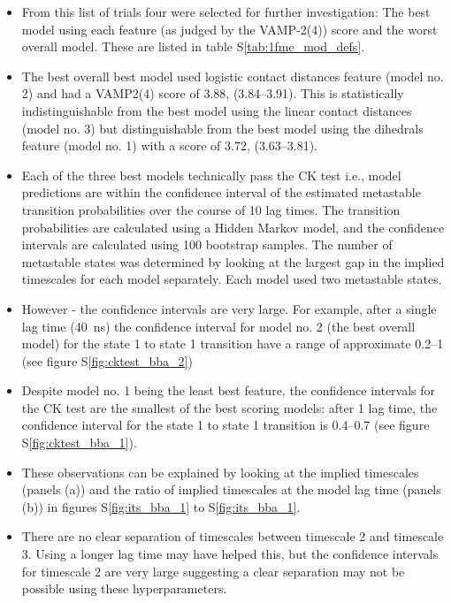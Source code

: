 \documentclass[journal=jacsat,manuscript=article]{achemso}
\newcommand*\sref[1]{%
    S\ref{#1}}
\begin{document}
\begin{itemize}

    \item From this list of trials four were selected for further investigation: The best model using each feature (as judged by the VAMP-2(4)) score and the worst overall model.  These are listed in table \sref{tab:1fme_mod_defs}. 
    \item The best overall best model used logistic contact distances feature (model no. 2) and had a VAMP2(4) score of \num{3.88}, (\numrange[range-phrase = --]{3.84}{3.91}). This is statistically indistinguishable from the best model using the linear contact distances (model no. 3) but distinguishable from the best model using the dihedrals feature (model no. 1) with a score of \num{3.72}, (\numrange[range-phrase = --]{3.63}{3.81}). 
    \item Each of the three best models technically pass the CK test i.e., model predictions are within the confidence interval of the estimated metastable transition probabilities over the course of 10 lag times. The transition probabilities are calculated using a Hidden Markov model, and the confidence intervals are calculated using 100 bootstrap samples. The number of metastable states was determined by looking at the largest gap in the implied timescales for each model separately. Each model used two metastable states. 
    \item However - the confidence intervals are very large.  For example, after a single lag time (\SI{40}{\nano\second}) the confidence interval for model no. 2 (the best overall model) for the state 1 to state 1 transition have a range of approximate \numrange{0.2}{1} (see figure \sref{fig:cktest_bba_2})
    \item Despite model no. 1  being the least best feature, the confidence intervals for the CK test are the smallest of the best scoring models: after 1 lag time, the confidence interval for the state 1 to state 1 transition is \numrange[range-phrase = --]{0.4}{0.7}  (see figure \sref{fig:cktest_bba_1}).  
    \item These observations can be explained by looking at the implied timescales (panels (a)) and the ratio of implied timescales at the model lag time (panels (b)) in figures \sref{fig:its_bba_1} to \sref{fig:its_bba_1}. 
    \item There are no clear separation of timescales between timescale 2 and timescale 3.  Using a longer lag time may have helped this, but the confidence intervals for timescale 2 are very large suggesting a clear separation may not be possible using these hyperparameters. 
\end{itemize}
\end{document}

